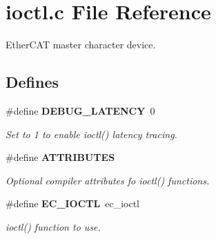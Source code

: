 \section{ioctl.\-c \-File \-Reference}
\label{ioctl_8c}


\-Ether\-C\-A\-T master character device.  


\subsection*{\-Defines}
\begin{DoxyCompactItemize}
\item 
\#define {\bf \-D\-E\-B\-U\-G\-\_\-\-L\-A\-T\-E\-N\-C\-Y}~0
\begin{DoxyCompactList}\small\item\em \-Set to 1 to enable ioctl() latency tracing. \end{DoxyCompactList}\item 
\#define {\bf \-A\-T\-T\-R\-I\-B\-U\-T\-E\-S}\label{ioctl_8c_ae456bc7dfd6c3d54bccef2e234ecae7a}

\begin{DoxyCompactList}\small\item\em \-Optional compiler attributes fo ioctl() functions. \end{DoxyCompactList}\item 
\#define {\bf \-E\-C\-\_\-\-I\-O\-C\-T\-L}~ec\-\_\-ioctl\label{ioctl_8c_a80a51dad3458ecb73d12369fa9b50a02}

\begin{DoxyCompactList}\small\item\em ioctl() function to use. \end{DoxyCompactList}\end{DoxyCompactItemize}
